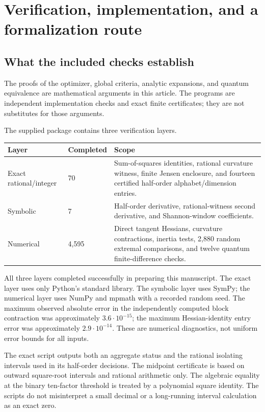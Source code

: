 \documentclass[11pt]{article}
\numberwithin{equation}{section}
\theoremstyle{definition}
\theoremstyle{remark}
\begin{document}
\section{Verification, implementation, and a formalization route}
\label{bep:ae:sec:verification}
\subsection{What the included checks establish}
The proofs of the optimizer, global criteria, analytic expansions, and
quantum equivalence are mathematical arguments in this article. The
programs are independent implementation checks and exact finite
certificates; they are not substitutes for those arguments.

The supplied package contains three verification layers.
\begin{center}
\begin{tabular}{p{.23\linewidth}p{.13\linewidth}p{.52\linewidth}}
\toprule
Layer&Completed&Scope\\
\midrule
Exact rational/integer&70&Sum-of-squares identities, rational
curvature witness, finite Jensen enclosure, and fourteen certified
half-order alphabet/dimension entries.\\[3pt]
Symbolic&7&Half-order derivative, rational-witness second
derivative, and Shannon-window coefficients.\\[3pt]
Numerical&4,595&Direct tangent Hessians, curvature contractions,
inertia tests, 2,880 random extremal comparisons, and twelve quantum
finite-difference checks.\\
\bottomrule
\end{tabular}
\end{center}
All three layers completed successfully in preparing this manuscript.
The exact layer uses only Python's standard library. The symbolic layer
uses SymPy; the numerical layer uses NumPy and mpmath with a recorded
random seed. The maximum observed absolute error in the independently
computed block contraction was approximately $3.6\cdot10^{-15}$; the
maximum Hessian-identity entry error was approximately
$2.9\cdot10^{-14}$. These are numerical diagnostics, not uniform error
bounds for all inputs.

The exact script outputs both an aggregate status and the rational
isolating intervals used in its half-order decisions. The midpoint
certificate is based on outward square-root intervals and rational
arithmetic only. The algebraic equality at the binary ten-factor
threshold is treated by a polynomial square identity. The scripts do
not misinterpret a small decimal or a long-running interval calculation
as an exact zero.
\end{document}
